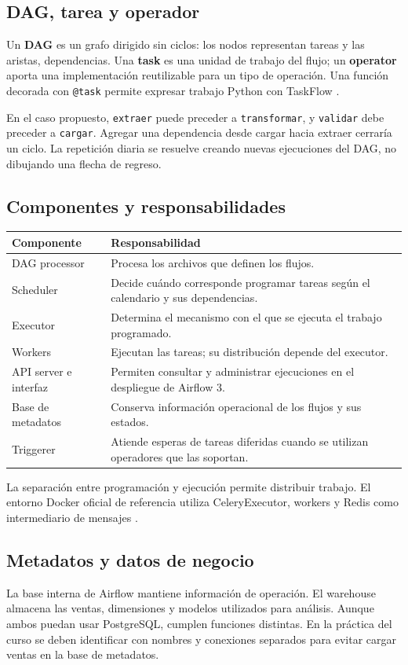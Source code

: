 \documentclass[12pt]{article}
\begin{document}
\subsection{DAG, tarea y operador}
Un \textbf{DAG} es un grafo dirigido sin ciclos: los nodos representan tareas y las aristas, dependencias. Una \textbf{task} es una unidad de trabajo del flujo; un \textbf{operator} aporta una implementación reutilizable para un tipo de operación. Una función decorada con \texttt{@task} permite expresar trabajo Python con TaskFlow \cite{airflow_overview,airflow_taskflow}.

En el caso propuesto, \texttt{extraer} puede preceder a \texttt{transformar}, y \texttt{validar} debe preceder a \texttt{cargar}. Agregar una dependencia desde cargar hacia extraer cerraría un ciclo. La repetición diaria se resuelve creando nuevas ejecuciones del DAG, no dibujando una flecha de regreso.

\subsection{Componentes y responsabilidades}
\begin{longtable}{@{}p{}p{}@{}}
\toprule
\textbf{Componente} & \textbf{Responsabilidad} \\
\midrule
DAG processor & Procesa los archivos que definen los flujos. \\
Scheduler & Decide cuándo corresponde programar tareas según el calendario y sus dependencias. \\
Executor & Determina el mecanismo con el que se ejecuta el trabajo programado. \\
Workers & Ejecutan las tareas; su distribución depende del executor. \\
API server e interfaz & Permiten consultar y administrar ejecuciones en el despliegue de Airflow 3. \\
Base de metadatos & Conserva información operacional de los flujos y sus estados. \\
Triggerer & Atiende esperas de tareas diferidas cuando se utilizan operadores que las soportan. \\
\bottomrule
\end{longtable}
La separación entre programación y ejecución permite distribuir trabajo. El entorno Docker oficial de referencia utiliza CeleryExecutor, workers y Redis como intermediario de mensajes \cite{airflow_overview,airflow_docker}.

\subsection{Metadatos y datos de negocio}
La base interna de Airflow mantiene información de operación. El warehouse almacena las ventas, dimensiones y modelos utilizados para análisis. Aunque ambos puedan usar PostgreSQL, cumplen funciones distintas. En la práctica del curso se deben identificar con nombres y conexiones separados para evitar cargar ventas en la base de metadatos.
\end{document}

